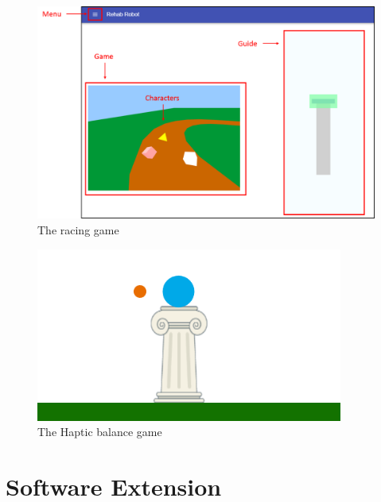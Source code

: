 \documentclass[12pt]{report}
\begin{document}
	 
	
	

	
	\begin{figure}[h] 
		\centering
		\includegraphics[width=\linewidth]{UI_game_label}
		\caption{The racing game}
		\label{fig:race}
	\end{figure} 
	



\begin{figure}[h] 
		\centering
		\includegraphics[width=0.75\linewidth]{balance_game}
		\caption{The Haptic balance game}
		\label{fig:balance_game}
	\end{figure} 
			
	\section{Software Extension}
	
			
\end{document}
